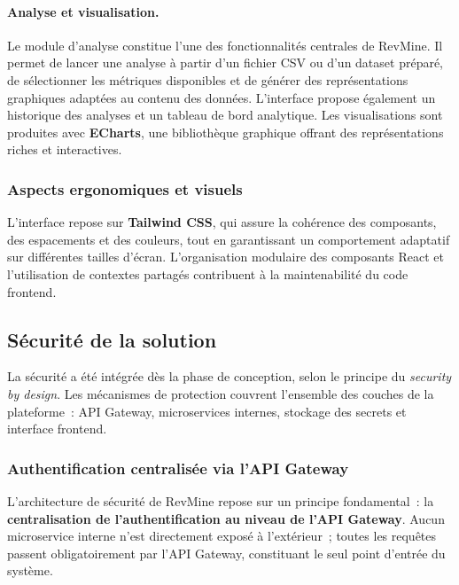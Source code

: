 \paragraph{Analyse et visualisation.} Le module d'analyse constitue l'une des fonctionnalités
centrales de RevMine. Il permet de lancer une analyse à partir d'un fichier CSV ou d'un dataset
préparé, de sélectionner les métriques disponibles et de générer des représentations graphiques
adaptées au contenu des données. L'interface propose également un historique des analyses et un
tableau de bord analytique. Les visualisations sont produites avec \textbf{ECharts}, une
bibliothèque graphique offrant des représentations riches et interactives.

\subsubsection{Aspects ergonomiques et visuels}

L'interface repose sur \textbf{Tailwind CSS}, qui assure la cohérence des composants, des
espacements et des couleurs, tout en garantissant un comportement adaptatif sur différentes
tailles d'écran. L'organisation modulaire des composants React et l'utilisation de contextes
partagés contribuent à la maintenabilité du code frontend.

\subsection{Sécurité de la solution}

La sécurité a été intégrée dès la phase de conception, selon le principe du
\textit{security by design}. Les mécanismes de protection couvrent l'ensemble des couches de
la plateforme~: API Gateway, microservices internes, stockage des secrets et interface frontend.

\subsubsection{Authentification centralisée via l'API Gateway}

L'architecture de sécurité de RevMine repose sur un principe fondamental~: la
\textbf{centralisation de l'authentification au niveau de l'API Gateway}. Aucun microservice
interne n'est directement exposé à l'extérieur~; toutes les requêtes passent obligatoirement
par l'API Gateway, constituant le seul point d'entrée du système.


